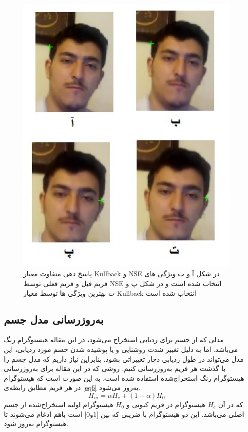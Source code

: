 \documentclass[paper=a4, fontsize=12pt]{article} %
\begin{document}
\begin{figure}
\centering
\includegraphics[width=12cm]{unsimilar.jpg}
\caption{پاسخ دهی متفاوت معیار Kullback و NSE در شکل آ و ب ویژگی های فریم قبل و فریم فعلی توسط NSE انتخاب شده است و در شکل پ و ت بهترین ویژگی ها توسط معیار Kullback انتخاب شده است}
\label{pic-unsim}
\end{figure}


\subsection{ به‌روزرسانی مدل جسم}
مدلی که از جسم برای ردیابی استخراج می‌شود، در این مقاله هیستوگرام رنگ می‌باشد. اما به دلیل تغییر شدت روشنایی و یا پوشیده شدن جسم مورد ردیابی، این مدل می‌تواند در طول ردیابی دچار تغییراتی بشود. بنابراین نیاز داریم که مدل جسم را با گذشت هر فریم به‌روزرسانی کنیم.
روشی که در این مقاله برای به‌روزرسانی هیستوگرام رنگ استخراج‌شده استفاده شده است، به این صورت است که هیستوگرام در هر فریم مطابق رابطه‌ی \ref{eq6} به‌روز می‌شود.
\begin{equation}
H_m=\alpha H_c + (1-\alpha)H_0
\label{eq6}
\end{equation}
که در آن $H_c$ هیستوگرام در فریم کنونی و      $H_0$	هیستوگرام اولیه استخراج‌شده از جسم اصلی می‌باشد. این دو هیستوگرام با ضریبی که بین [1و0] است باهم ادغام می‌شوند تا هیستوگرام به‌روز شود.
\end{document}

